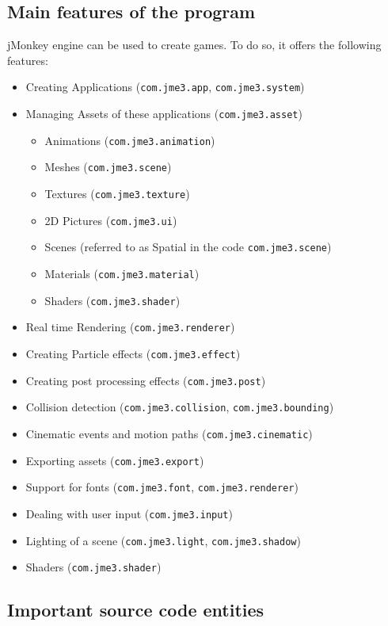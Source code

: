 \documentclass[a4paper, 10pt]{article}
\begin{document}
\subsection{Main features of the program}
\label{sec:main_features}
jMonkey engine can be used to create games.
To do so, it offers the following features:
\begin{itemize}
	\item Creating Applications 
	(\verb|com.jme3.app|, \verb|com.jme3.system|)
	\item Managing Assets of these applications (\verb|com.jme3.asset|)
	\begin{itemize}
		\item Animations (\verb|com.jme3.animation|)
		\item Meshes (\verb|com.jme3.scene|)
		\item Textures (\verb|com.jme3.texture|)
		\item 2D Pictures (\verb|com.jme3.ui|)
		\item Scenes 
		(referred to as Spatial in the code \verb|com.jme3.scene|)
		\item Materials (\verb|com.jme3.material|)
		\item Shaders (\verb|com.jme3.shader|)
	\end{itemize}
	
	\item Real time Rendering (\verb|com.jme3.renderer|)
	\item Creating Particle effects (\verb|com.jme3.effect|)
	\item Creating post processing effects (\verb|com.jme3.post|)
	\item Collision detection 
	(\verb|com.jme3.collision|, 
	\verb|com.jme3.bounding|)
	\item Cinematic events and motion paths
	(\verb|com.jme3.cinematic|)
	\item Exporting assets (\verb|com.jme3.export|)
	\item Support for fonts 
	(\verb|com.jme3.font|, \verb|com.jme3.renderer|)
	\item Dealing with user input (\verb|com.jme3.input|)
	\item Lighting of a scene 
	(\verb|com.jme3.light|, \verb|com.jme3.shadow|)
	\item Shaders (\verb|com.jme3.shader|)
\end{itemize}



\subsection{Important source code entities}
\label{sec:important_src_entities}
\end{document}
